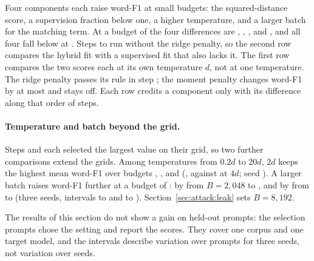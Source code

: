Four components each raise word-F1 at small budgets: the squared-distance score, a supervision fraction below one, a higher temperature, and a larger batch for the matching term.
At a budget of  the four differences are , , , and , and all four fall below  at . %
Steps  to  run without the ridge penalty, so the second row compares the hybrid fit with a supervised fit that also lacks it.
The first row compares the two scores each at its own temperature $d$, not at one temperature. %
The ridge penalty passes its rule in step ; the moment penalty changes word-F1 by at most  and stays off. %
Each row credits a component only with its difference along that order of steps.

\paragraph{Temperature and batch beyond the grid.} Steps  and  each selected the largest value on their grid, so two further comparisons extend the grids.
Among temperatures from $0.2d$ to $20d$, $2d$ keeps the highest mean word-F1 over budgets , , and  (, against  at $4d$; seed ). %
A larger batch raises word-F1 further at a budget of : by  from $B = 2{,}048$ to , and by  from  to  (three seeds, intervals  to  and  to ). %
Section~\ref{sec:attack:leak} sets $B = 8{,}192$.

The results of this section do not show a gain on held-out prompts: the  selection prompts chose the setting and report the scores.
They cover one corpus and one target model, and the intervals describe variation over prompts for three seeds, not variation over seeds.
